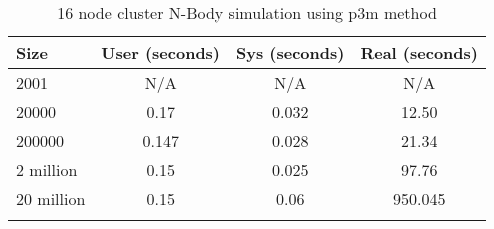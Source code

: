 \begin{table}[htb]
\centering{}
\begin{tabular}{lccc}
\toprule{}
\textbf{Size} & \textbf{User (seconds)} &
\textbf{Sys (seconds)} & \textbf{Real (seconds)} \\
\midrule{}
2001          & N/A     & N/A      & N/A     \\
\midrule{}
20000         & 0.17    & 0.032    & 12.50   \\
\midrule{}
200000        & 0.147   & 0.028    & 21.34   \\
\midrule{}
2 million     & 0.15    & 0.025    & 97.76   \\
\midrule{}
20 million    & 0.15    & 0.06     & 950.045 \\
\bottomrule{}
\end{tabular}
\caption{16 node \gls{cluster} N-Body simulation using \gls{p3m} method}
\label{tab:cudampi_nbody}
\end{table}

